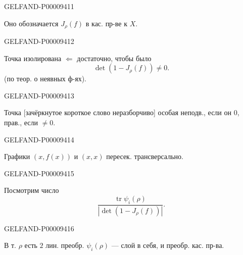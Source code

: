 \begin{GelfandAdjacentEvidence}{GELFAND-P000094}{11}

Оно обозначается $J_\rho(f)$ в кас. пр-ве к $X$.
\end{GelfandAdjacentEvidence}
\begin{GelfandAdjacentEvidence}{GELFAND-P000094}{12}

Точка изолирована $\Leftarrow$ достаточно, чтобы было
\begin{equation*}\det(1-J_\rho(f))\ne0.\end{equation*}
(по теор. о неявных ф-ях).
\end{GelfandAdjacentEvidence}
\begin{GelfandAdjacentEvidence}{GELFAND-P000094}{13}

Точка [зачёркнутое короткое слово неразборчиво] особая неподв., если он $0$, прав., если $\ne0$.
\end{GelfandAdjacentEvidence}
\begin{GelfandAdjacentEvidence}{GELFAND-P000094}{14}

Графики $(x,f(x))$ и $(x,x)$ пересек. трансверсально.
\end{GelfandAdjacentEvidence}
\begin{GelfandAdjacentEvidence}{GELFAND-P000094}{15}

Посмотрим число
\begin{equation*}
\frac{\operatorname{tr}\psi_i(\rho)}{|\det(1-J_\rho(f))|}.
\end{equation*}
\end{GelfandAdjacentEvidence}
\begin{GelfandAdjacentEvidence}{GELFAND-P000094}{16}

В т. $\rho$ есть $2$ лин. преобр. $\psi_i(\rho)$ — слой в себя,
и преобр. кас. пр-ва.
\end{GelfandAdjacentEvidence}
